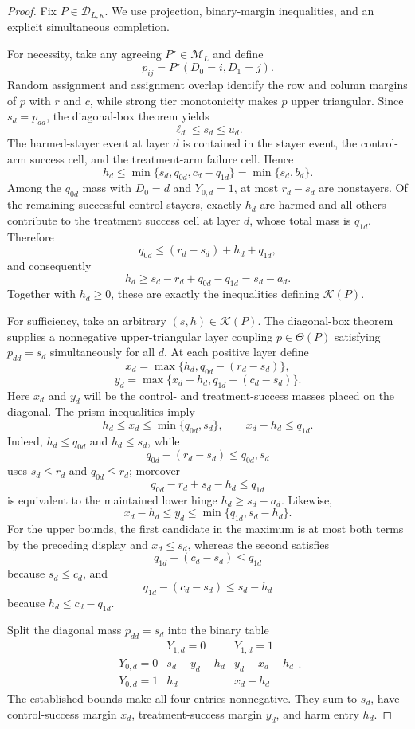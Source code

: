 \documentclass{article}
\begin{document}
\begin{proof}
Fix \(P\in\mathcal D_{L,\kappa}\).  We use projection, binary-margin inequalities, and an explicit simultaneous completion.

For necessity, take any agreeing \(P^{\star}\in\mathcal M_L\) and define
\[
 p_{ij}=P^{\star}(D_0=i,D_1=j).
\]
Random assignment and assignment overlap identify the row and column margins of \(p\) with \(r\) and \(c\), while strong tier monotonicity makes \(p\) upper triangular.  Since \(s_d=p_{dd}\), the diagonal-box theorem yields
\[
 \ell_d\le s_d\le u_d.
\]
The harmed-stayer event at layer \(d\) is contained in the stayer event, the control-arm success cell, and the treatment-arm failure cell.  Hence
\[
 h_d\le \min\{s_d,q_{0d},c_d-q_{1d}\}
 =\min\{s_d,b_d\}.
\]
Among the \(q_{0d}\) mass with \(D_0=d\) and \(Y_{0,d}=1\), at most \(r_d-s_d\) are nonstayers.  Of the remaining successful-control stayers, exactly \(h_d\) are harmed and all others contribute to the treatment success cell at layer \(d\), whose total mass is \(q_{1d}\).  Therefore
\[
 q_{0d}\le(r_d-s_d)+h_d+q_{1d},
\]
and consequently
\[
 h_d\ge s_d-r_d+q_{0d}-q_{1d}=s_d-a_d.
\]
Together with \(h_d\ge0\), these are exactly the inequalities defining \(\mathcal K(P)\).

For sufficiency, take an arbitrary \((s,h)\in\mathcal K(P)\).  The diagonal-box theorem supplies a nonnegative upper-triangular layer coupling \(p\in\Theta(P)\) satisfying \(p_{dd}=s_d\) simultaneously for all \(d\).  At each positive layer define
\[
 x_d=\max\{h_d,q_{0d}-(r_d-s_d)\},
\]
\[
 y_d=\max\{x_d-h_d,q_{1d}-(c_d-s_d)\}.
\]
Here \(x_d\) and \(y_d\) will be the control- and treatment-success masses placed on the diagonal.  The prism inequalities imply
\[
 h_d\le x_d\le\min\{q_{0d},s_d\},
 \qquad
 x_d-h_d\le q_{1d}.
\]
Indeed, \(h_d\le q_{0d}\) and \(h_d\le s_d\), while
\[
 q_{0d}-(r_d-s_d)\le q_{0d},s_d
\]
uses \(s_d\le r_d\) and \(q_{0d}\le r_d\); moreover
\[
 q_{0d}-r_d+s_d-h_d\le q_{1d}
\]
is equivalent to the maintained lower hinge \(h_d\ge s_d-a_d\).  Likewise,
\[
 x_d-h_d\le y_d\le\min\{q_{1d},s_d-h_d\}.
\]
For the upper bounds, the first candidate in the maximum is at most both terms by the preceding display and \(x_d\le s_d\), whereas the second satisfies
\[
 q_{1d}-(c_d-s_d)\le q_{1d}
\]
because \(s_d\le c_d\), and
\[
 q_{1d}-(c_d-s_d)\le s_d-h_d
\]
because \(h_d\le c_d-q_{1d}\).

Split the diagonal mass \(p_{dd}=s_d\) into the binary table
\[
\begin{array}{c|cc}
 &Y_{1,d}=0&Y_{1,d}=1\\ \hline
Y_{0,d}=0&s_d-y_d-h_d&y_d-x_d+h_d\\
Y_{0,d}=1&h_d&x_d-h_d
\end{array}.
\]
The established bounds make all four entries nonnegative.  They sum to \(s_d\), have control-success margin \(x_d\), treatment-success margin \(y_d\), and harm entry \(h_d\).


\end{proof}
\end{document}
